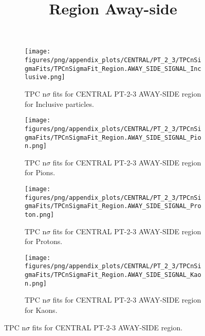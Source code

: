             \begin{figure}[H]
                \title{Region Away-side}
                \begin{subfigure}[b]{0.5\textwidth}
                    \centering
                    \texttt{[image: figures/png/appendix\_plots/CENTRAL/PT\_2\_3/TPCnSigmaFits/TPCnSigmaFit\_Region.AWAY\_SIDE\_SIGNAL\_Inclusive.png]}
                    \caption{TPC n$\sigma$ fits for CENTRAL PT-2-3 AWAY-SIDE region for Inclusive particles.}
                    \label{fig:appendix_CENTRAL_PT-2-3_AWAY_SIDE_SIGNAL_Inclusive}
                \end{subfigure}
                \begin{subfigure}[b]{0.5\textwidth}
                    \centering
                    \texttt{[image: figures/png/appendix\_plots/CENTRAL/PT\_2\_3/TPCnSigmaFits/TPCnSigmaFit\_Region.AWAY\_SIDE\_SIGNAL\_Pion.png]}
                    \caption{TPC n$\sigma$ fits for CENTRAL PT-2-3 AWAY-SIDE region for Pions.}
                    \label{fig:appendix_CENTRAL_PT-2-3_AWAY_SIDE_SIGNAL_Pion}
                \end{subfigure}
                \begin{subfigure}[b]{0.5\textwidth}
                    \centering
                    \texttt{[image: figures/png/appendix\_plots/CENTRAL/PT\_2\_3/TPCnSigmaFits/TPCnSigmaFit\_Region.AWAY\_SIDE\_SIGNAL\_Proton.png]}
                    \caption{TPC n$\sigma$ fits for CENTRAL PT-2-3 AWAY-SIDE region for Protons.}
                    \label{fig:appendix_CENTRAL_PT-2-3_AWAY_SIDE_SIGNAL_Proton}
                \end{subfigure}
                \begin{subfigure}[b]{0.5\textwidth}
                    \centering
                    \texttt{[image: figures/png/appendix\_plots/CENTRAL/PT\_2\_3/TPCnSigmaFits/TPCnSigmaFit\_Region.AWAY\_SIDE\_SIGNAL\_Kaon.png]}
                    \caption{TPC n$\sigma$ fits for CENTRAL PT-2-3 AWAY-SIDE region for Kaons.}
                    \label{fig:appendix_CENTRAL_PT-2-3_AWAY_SIDE_SIGNAL_Kaon}
                \end{subfigure}
                \caption{TPC n$\sigma$ fits for CENTRAL PT-2-3 AWAY-SIDE region.}
                \label{fig:appendix_CENTRAL_PT-2-3_AWAY_SIDE_SIGNAL}
            \end{figure}
